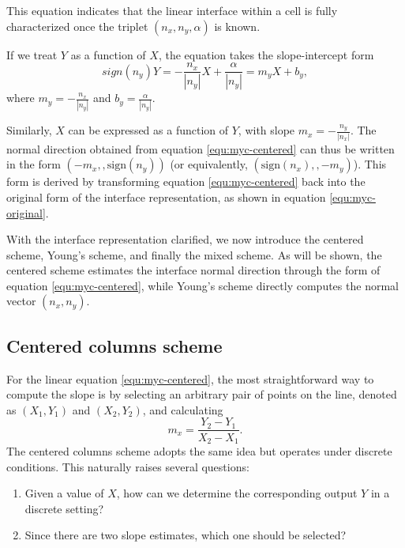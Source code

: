 This equation indicates that the linear interface within a cell is fully characterized once the triplet $(n_x, n_y, \alpha)$ is known.

If we treat $Y$ as a function of $X$, the equation takes the slope-intercept form
\begin{equation}\label{equ:myc-centered}
  sign(n_y)Y = -\frac{n_x}{|n_y|} X + \frac{\alpha}{|n_y|} = m_y X + b_y,
\end{equation}
where $m_y = -\frac{n_x}{|n_y|}$ and $b_y = \frac{\alpha}{|n_y|}$.

Similarly, $X$ can be expressed as a function of $Y$, with slope $m_x = -\frac{n_y}{|n_x|}$. The normal direction obtained from equation \ref{equ:myc-centered} can thus be written in the form $(-m_x,, \text{sign}(n_y))$ (or equivalently, $(\text{sign}(n_x),, -m_y)$). This form is derived by transforming equation \ref{equ:myc-centered} back into the original form of the interface representation, as shown in equation \ref{equ:myc-original}.

With the interface representation clarified, we now introduce the centered scheme, Young’s scheme, and finally the mixed scheme. As will be shown, the centered scheme estimates the interface normal direction through the form of equation \ref{equ:myc-centered}, while Young’s scheme directly computes the normal vector $(n_x, n_y)$.
\subsection{Centered columns scheme}\label{sec:myc-centered}

For the linear equation \ref{equ:myc-centered}, the most straightforward way to compute the slope is by selecting an arbitrary pair of points on the line, denoted as $(X_1, Y_1)$ and $(X_2, Y_2)$, and calculating  
\begin{equation}
  m_x = \frac{Y_2 - Y_1}{X_2 - X_1}.
\end{equation}  
The centered columns scheme adopts the same idea but operates under discrete conditions. This naturally raises several questions:  
\begin{enumerate}
  \item Given a value of $X$, how can we determine the corresponding output $Y$ in a discrete setting?
  \item Since there are two slope estimates, which one should be selected?
\end{enumerate}

